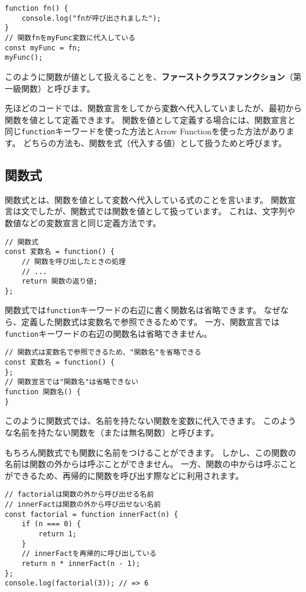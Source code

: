 \begin{lstlisting}
function fn() {
    console.log("fnが呼び出されました");
}
// 関数fnをmyFunc変数に代入している
const myFunc = fn;
myFunc();
\end{lstlisting}

このように関数が値として扱えることを、\textbf{ファーストクラスファンクション}（第一級関数）と呼びます。

先ほどのコードでは、関数宣言をしてから変数へ代入していましたが、最初から関数を値として定義できます。
関数を値として定義する場合には、関数宣言と同じ\texttt{function}キーワードを使った方法とArrow
Functionを使った方法があります。
どちらの方法も、関数を式（代入する値）として扱うため\textbf{}と呼びます。

\hypertarget{function-expression}{%
\subsection{関数式}\label{function-expression}}

関数式とは、関数を値として変数へ代入している式のことを言います。
関数宣言は文でしたが、関数式では関数を値として扱っています。
これは、文字列や数値などの変数宣言と同じ定義方法です。

\begin{lstlisting}
// 関数式
const 変数名 = function() {
    // 関数を呼び出したときの処理
    // ...
    return 関数の返り値;
};
\end{lstlisting}

関数式では\texttt{function}キーワードの右辺に書く関数名は省略できます。
なぜなら、定義した関数式は変数名で参照できるためです。
一方、関数宣言では\texttt{function}キーワードの右辺の関数名は省略できません。

\begin{lstlisting}
// 関数式は変数名で参照できるため、"関数名"を省略できる
const 変数名 = function() {
};
// 関数宣言では"関数名"は省略できない
function 関数名() {
}
\end{lstlisting}

このように関数式では、名前を持たない関数を変数に代入できます。
このような名前を持たない関数を\textbf{}（または無名関数）と呼びます。

もちろん関数式でも関数に名前をつけることができます。
しかし、この関数の名前は関数の外からは呼ぶことができません。
一方、関数の中からは呼ぶことができるため、再帰的に関数を呼び出す際などに利用されます。

\begin{lstlisting}
// factorialは関数の外から呼び出せる名前
// innerFactは関数の外から呼び出せない名前
const factorial = function innerFact(n) {
    if (n === 0) {
        return 1;
    }
    // innerFactを再帰的に呼び出している
    return n * innerFact(n - 1);
};
console.log(factorial(3)); // => 6
\end{lstlisting}

